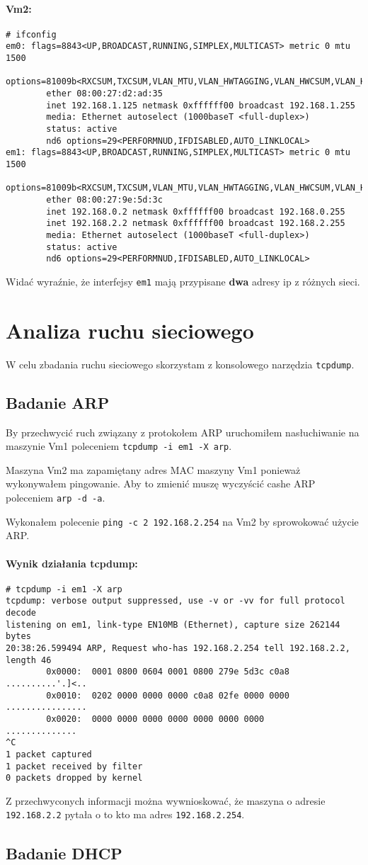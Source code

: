 \documentclass{mwart} %
\begin{document}
\paragraph{Vm2:}
\begin{verbatim}
# ifconfig
em0: flags=8843<UP,BROADCAST,RUNNING,SIMPLEX,MULTICAST> metric 0 mtu 1500
        options=81009b<RXCSUM,TXCSUM,VLAN_MTU,VLAN_HWTAGGING,VLAN_HWCSUM,VLAN_HWFILTER>
        ether 08:00:27:d2:ad:35
        inet 192.168.1.125 netmask 0xffffff00 broadcast 192.168.1.255
        media: Ethernet autoselect (1000baseT <full-duplex>)
        status: active
        nd6 options=29<PERFORMNUD,IFDISABLED,AUTO_LINKLOCAL>
em1: flags=8843<UP,BROADCAST,RUNNING,SIMPLEX,MULTICAST> metric 0 mtu 1500
        options=81009b<RXCSUM,TXCSUM,VLAN_MTU,VLAN_HWTAGGING,VLAN_HWCSUM,VLAN_HWFILTER>
        ether 08:00:27:9e:5d:3c
        inet 192.168.0.2 netmask 0xffffff00 broadcast 192.168.0.255
        inet 192.168.2.2 netmask 0xffffff00 broadcast 192.168.2.255
        media: Ethernet autoselect (1000baseT <full-duplex>)
        status: active
        nd6 options=29<PERFORMNUD,IFDISABLED,AUTO_LINKLOCAL>
\end{verbatim}

Widać wyraźnie, że interfejsy \texttt{em1} mają przypisane \textbf{dwa} adresy ip z różnych sieci.

\section{Analiza ruchu sieciowego}
W celu zbadania ruchu sieciowego skorzystam z konsolowego narzędzia \texttt{tcpdump}.

\subsection{Badanie ARP}
By przechwycić ruch związany z protokołem ARP uruchomiłem nasłuchiwanie na maszynie Vm1 poleceniem \texttt{tcpdump -i em1 -X arp}.

Maszyna Vm2 ma zapamiętany adres MAC maszyny Vm1 ponieważ wykonywałem pingowanie. Aby to zmienić muszę wyczyścić cashe ARP poleceniem \texttt{arp -d -a}.

Wykonałem polecenie \texttt{ping -c 2 192.168.2.254} na Vm2 by sprowokować użycie ARP.

\paragraph{Wynik działania tcpdump:}
\begin{verbatim}
# tcpdump -i em1 -X arp
tcpdump: verbose output suppressed, use -v or -vv for full protocol decode
listening on em1, link-type EN10MB (Ethernet), capture size 262144 bytes
20:38:26.599494 ARP, Request who-has 192.168.2.254 tell 192.168.2.2, length 46
        0x0000:  0001 0800 0604 0001 0800 279e 5d3c c0a8  ..........'.]<..
        0x0010:  0202 0000 0000 0000 c0a8 02fe 0000 0000  ................
        0x0020:  0000 0000 0000 0000 0000 0000 0000       ..............
^C
1 packet captured
1 packet received by filter
0 packets dropped by kernel
\end{verbatim}

Z przechwyconych informacji można wywnioskować, że maszyna o adresie \texttt{192.168.2.2} pytała o to kto ma adres \texttt{192.168.2.254}.

\subsection{Badanie DHCP}
\end{document}
